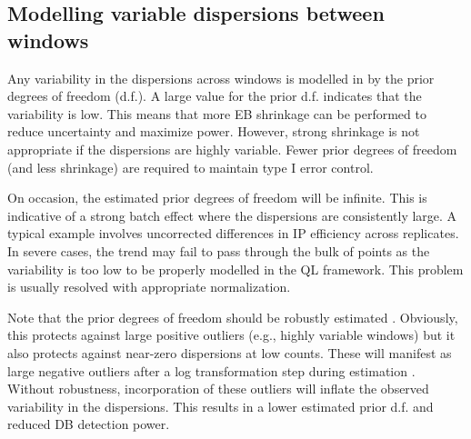 \documentclass{report}\usepackage[]{graphicx}\usepackage[usenames,dvipsnames]{color}
\newcommand{\hlopt}[1]{\textcolor[rgb]{0,0,0}{#1}}%
\newcommand{\hlstd}[1]{\textcolor[rgb]{0.251,0.251,0.251}{#1}}%
\newcommand{\hlkwd}[1]{\textcolor[rgb]{0.878,0.439,0.125}{#1}}%
\newenvironment{knitrout}{}{} %
\begin{document}
\subsection{Modelling variable dispersions between windows}
Any variability in the dispersions across windows is modelled in  by the prior degrees of freedom (d.f.).
A large value for the prior d.f. indicates that the variability is low. 
This means that more EB shrinkage can be performed to reduce uncertainty and maximize power. 
However, strong shrinkage is not appropriate if the dispersions are highly variable. 
Fewer prior degrees of freedom (and less shrinkage) are required to maintain type I error control. 

\begin{knitrout}
\color{fgcolor}
\end{knitrout}

On occasion, the estimated prior degrees of freedom will be infinite. 
This is indicative of a strong batch effect where the dispersions are consistently large.
A typical example involves uncorrected differences in IP efficiency across replicates. 
In severe cases, the trend may fail to pass through the bulk of points as the variability is too low to be properly modelled in the QL framework.
This problem is usually resolved with appropriate normalization.

Note that the prior degrees of freedom should be robustly estimated \cite{phipson2016}. 
Obviously, this protects against large positive outliers (e.g., highly variable windows) but it also protects against near-zero dispersions at low counts. 
These will manifest as large negative outliers after a log transformation step during estimation \cite{smyth2004}. 
Without robustness, incorporation of these outliers will inflate the observed variability in the dispersions.
This results in a lower estimated prior d.f. and reduced DB detection power.

\end{document}
